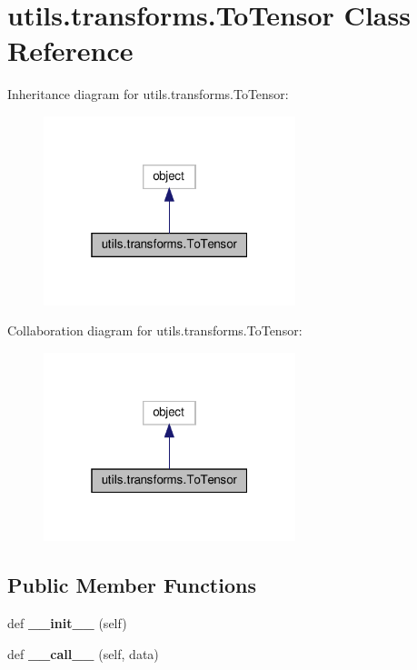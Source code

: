\hypertarget{classutils_1_1transforms_1_1ToTensor}{}\section{utils.\+transforms.\+To\+Tensor Class Reference}
\label{classutils_1_1transforms_1_1ToTensor}


Inheritance diagram for utils.\+transforms.\+To\+Tensor\+:
\nopagebreak
\begin{figure}[H]
\begin{center}
\leavevmode
\includegraphics[width=208pt]{classutils_1_1transforms_1_1ToTensor__inherit__graph}
\end{center}
\end{figure}


Collaboration diagram for utils.\+transforms.\+To\+Tensor\+:
\nopagebreak
\begin{figure}[H]
\begin{center}
\leavevmode
\includegraphics[width=208pt]{classutils_1_1transforms_1_1ToTensor__coll__graph}
\end{center}
\end{figure}
\subsection*{Public Member Functions}
\begin{DoxyCompactItemize}
\item 
\mbox{\label{classutils_1_1transforms_1_1ToTensor_a8bb4ffe067ae9077b0443896a00f7614}} 
def {\bfseries \+\_\+\+\_\+init\+\_\+\+\_\+} (self)
\item 
\mbox{\label{classutils_1_1transforms_1_1ToTensor_a2c81085b3a275be7361d2980d4bc8909}} 
def {\bfseries \+\_\+\+\_\+call\+\_\+\+\_\+} (self, data)
\end{DoxyCompactItemize}


